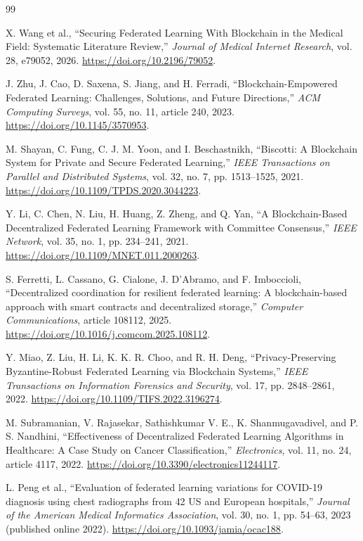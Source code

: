 \documentclass[12pt,a4paper]{report}
\begin{document}
\singlespacing
\begin{thebibliography}{99}
X. Wang et al., ``Securing Federated Learning With Blockchain in the Medical
Field: Systematic Literature Review,'' \textit{Journal of Medical Internet
Research}, vol. 28, e79052, 2026. \url{https://doi.org/10.2196/79052}.

J. Zhu, J. Cao, D. Saxena, S. Jiang, and H. Ferradi,
``Blockchain-Empowered Federated Learning: Challenges, Solutions, and Future
Directions,'' \textit{ACM Computing Surveys}, vol. 55, no. 11, article 240,
2023. \url{https://doi.org/10.1145/3570953}.

M. Shayan, C. Fung, C. J. M. Yoon, and I. Beschastnikh,
``Biscotti: A Blockchain System for Private and Secure Federated Learning,''
\textit{IEEE Transactions on Parallel and Distributed Systems}, vol. 32,
no. 7, pp. 1513--1525, 2021.
\url{https://doi.org/10.1109/TPDS.2020.3044223}.

Y. Li, C. Chen, N. Liu, H. Huang, Z. Zheng, and Q. Yan,
``A Blockchain-Based Decentralized Federated Learning Framework with Committee
Consensus,'' \textit{IEEE Network}, vol. 35, no. 1, pp. 234--241, 2021.
\url{https://doi.org/10.1109/MNET.011.2000263}.

S. Ferretti, L. Cassano, G. Cialone, J. D'Abramo, and F. Imboccioli,
``Decentralized coordination for resilient federated learning: A blockchain-based
approach with smart contracts and decentralized storage,''
\textit{Computer Communications}, article 108112, 2025.
\url{https://doi.org/10.1016/j.comcom.2025.108112}.

Y. Miao, Z. Liu, H. Li, K. K. R. Choo, and R. H. Deng,
``Privacy-Preserving Byzantine-Robust Federated Learning via Blockchain Systems,''
\textit{IEEE Transactions on Information Forensics and Security}, vol. 17,
pp. 2848--2861, 2022. \url{https://doi.org/10.1109/TIFS.2022.3196274}.

M. Subramanian, V. Rajasekar, Sathishkumar V. E., K. Shanmugavadivel,
and P. S. Nandhini, ``Effectiveness of Decentralized Federated Learning
Algorithms in Healthcare: A Case Study on Cancer Classification,''
\textit{Electronics}, vol. 11, no. 24, article 4117, 2022.
\url{https://doi.org/10.3390/electronics11244117}.

L. Peng et al., ``Evaluation of federated learning variations for COVID-19
diagnosis using chest radiographs from 42 US and European hospitals,''
\textit{Journal of the American Medical Informatics Association}, vol. 30,
no. 1, pp. 54--63, 2023 (published online 2022).
\url{https://doi.org/10.1093/jamia/ocac188}.


\end{thebibliography}
\end{document}
